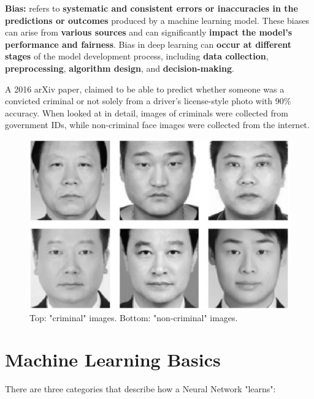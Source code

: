 \begin{definition}
    \textbf{Bias:} refers to \textbf{systematic and consistent errors or inaccuracies in the predictions or outcomes} produced by a machine learning model. These biases can arise from \textbf{various sources} and can significantly \textbf{impact the model's performance and fairness}. Bias in deep learning can \textbf{occur at different stages} of the model development process, including \textbf{data collection}, \textbf{preprocessing}, \textbf{algorithm design}, and \textbf{decision-making}. 
\end{definition}
\begin{example}
    A 2016 arXiv paper, claimed to be able to predict whether someone was a convicted criminal or not solely from a driver's license-style photo with 90\% accuracy.
When looked at in detail, images of criminals were collected from government IDs, while non-criminal face images were collected from the internet.
\end{example}
    \begin{figure} [h!t]
        \centering
        \includegraphics[width=0.5\linewidth]{criminalexamples.png}
        \caption{Top: "criminal" images. Bottom: "non-criminal" images.}
        
    \end{figure}
\section{Machine Learning Basics}

There are three categories that describe how a Neural Network "learns":


